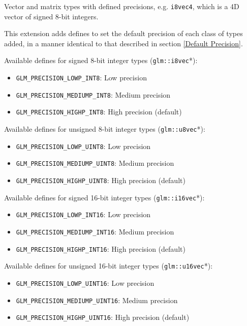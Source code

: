\documentclass{scrartcl}
\numberwithin{figure}{subsection}
\begin{document}
Vector and matrix types with defined precisions, e.g. \verb|i8vec4|, which is a 4D vector of signed 8-bit integers.

This extension adds defines to set the default precision of each class of types added, in a manner identical to that described in section \ref{Default Precision}.

Available defines for signed 8-bit integer types (\verb|glm::i8vec|*):

\begin{itemize}
    \item \verb|GLM_PRECISION_LOWP_INT8|: Low precision
    \item \verb|GLM_PRECISION_MEDIUMP_INT8|: Medium precision 
    \item \verb|GLM_PRECISION_HIGHP_INT8|: High precision (default)
\end{itemize}

Available defines for unsigned 8-bit integer types (\verb|glm::u8vec|*):

\begin{itemize}
    \item \verb|GLM_PRECISION_LOWP_UINT8|: Low precision
    \item \verb|GLM_PRECISION_MEDIUMP_UINT8|: Medium precision 
    \item \verb|GLM_PRECISION_HIGHP_UINT8|: High precision (default)
\end{itemize}

Available defines for signed 16-bit integer types (\verb|glm::i16vec|*):

\begin{itemize}
    \item \verb|GLM_PRECISION_LOWP_INT16|: Low precision
    \item \verb|GLM_PRECISION_MEDIUMP_INT16|: Medium precision 
    \item \verb|GLM_PRECISION_HIGHP_INT16|: High precision (default)
\end{itemize}

Available defines for unsigned 16-bit integer types (\verb|glm::u16vec|*):

\begin{itemize}
    \item \verb|GLM_PRECISION_LOWP_UINT16|: Low precision
    \item \verb|GLM_PRECISION_MEDIUMP_UINT16|: Medium precision 
    \item \verb|GLM_PRECISION_HIGHP_UINT16|: High precision (default)
\end{itemize}
\end{document}
